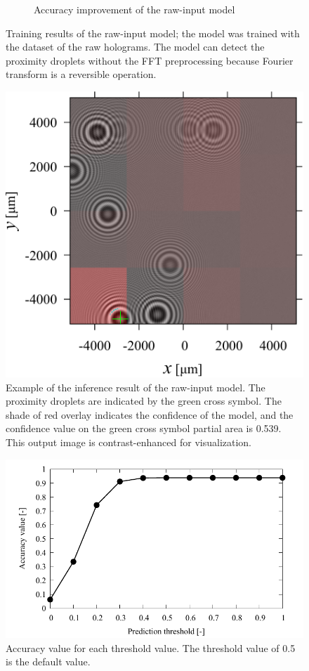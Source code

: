 \begin{figure}[H]
\begin{subfigure}[c]{0.45\linewidth}
        \caption{Accuracy improvement of the raw-input model}
        \label{fig:stripePatternExpExample:b}
    \end{subfigure}

    \caption{Training results of the raw-input model; the model was trained with the dataset of the raw holograms. The model can detect the proximity droplets without the FFT preprocessing because Fourier transform is a reversible operation.} 
    \label{fig:stripePatternExpExample}
\end{figure}

\begin{figure}[H]
    \centering
    \includegraphics[width=0.8\linewidth]{./Figure/4_Results/training/outholo.pdf}
    \caption{Example of the inference result of the raw-input model. The proximity droplets are indicated by the green cross symbol. The shade of red overlay indicates the confidence of the model, and the confidence value on the green cross symbol partial area is \num{0.539}. This output image is contrast-enhanced for visualization.}
    \label{fig:stripePatternVector}
\end{figure}

\begin{figure}[H]
    \centering
    \includegraphics[width=0.8\linewidth]{./Figure/4_Results/training/acc_threshold.pdf}
    \caption{Accuracy value for each threshold value. The threshold value of \num{0.5} is the default value.}
    \label{fig:stripePatternVector}
\end{figure}

